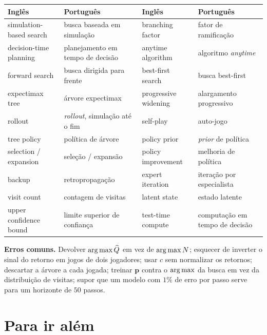 \documentclass[a4paper, 11pt]{article}
\newcommand{\Qh}{\widehat{Q}}
\begin{document}
{\footnotesize
\begin{tabular}{@{}p{3.3cm}p{4.15cm}p{3.15cm}p{4.15cm}@{}}
\toprule
\textbf{Inglês} & \textbf{Português} & \textbf{Inglês} & \textbf{Português} \\
\midrule
simulation-based search & busca baseada em simulação
  & branching factor      & fator de ramificação \\
decision-time planning  & planejamento em tempo de decisão
  & anytime algorithm     & algoritmo \emph{anytime} \\
forward search          & busca dirigida para frente
  & best-first search     & busca best-first \\
expectimax tree         & árvore expectimax
  & progressive widening  & alargamento progressivo \\
rollout                 & \emph{rollout}, simulação até o fim
  & self-play             & auto-jogo \\
tree policy             & política de árvore
  & policy prior          & \emph{prior} de política \\
selection / expansion   & seleção / expansão
  & policy improvement    & melhoria de política \\
backup                  & retropropagação
  & expert iteration      & iteração por especialista \\
visit count             & contagem de visitas
  & latent state          & estado latente \\
upper confidence bound  & limite superior de confiança
  & test-time compute     & computação em tempo de decisão \\
\bottomrule
\end{tabular}}

\begin{alertabox}
\textbf{Erros comuns.} Devolver $\argmax\Qh$ em vez de $\operatorname*{arg\,max} N$; esquecer de
inverter o sinal do retorno em jogos de dois jogadores; usar $c$ sem normalizar
os retornos; descartar a árvore a cada jogada; treinar $\bm{p}$ contra o
$\operatorname*{arg\,max}$ da busca em vez da distribuição de visitas; supor que um modelo com
$1\%$ de erro por passo serve para um horizonte de $50$ passos.
\end{alertabox}

\section{Para ir além}
\end{document}

